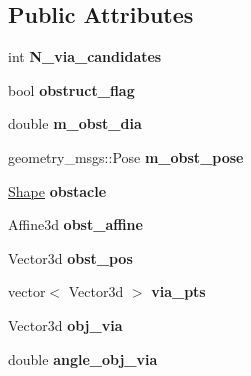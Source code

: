 \subsection*{Public Attributes}
\begin{DoxyCompactItemize}
\item 
\mbox{\label{classTool__Expt__2_afe0cdde93d9fa08f0cab5f3b9ad43127}} 
int {\bfseries N\+\_\+via\+\_\+candidates}
\item 
\mbox{\label{classTool__Expt__2_a69b682644f21f9266c2b8423d44e723c}} 
bool {\bfseries obstruct\+\_\+flag}
\item 
\mbox{\label{classTool__Expt__2_abcb49647ce6c224dfa504269461ce58c}} 
double {\bfseries m\+\_\+obst\+\_\+dia}
\item 
\mbox{\label{classTool__Expt__2_ad30eec8c81aed75a5938d8311330f298}} 
geometry\+\_\+msgs\+::\+Pose {\bfseries m\+\_\+obst\+\_\+pose}
\item 
\mbox{\label{classTool__Expt__2_aa39e482536af894df89c2960ddabb93f}} 
\hyperlink{structShape}{Shape} {\bfseries obstacle}
\item 
\mbox{\label{classTool__Expt__2_a0a84e97236e044343b9e4adc6dfacbc7}} 
Affine3d {\bfseries obst\+\_\+affine}
\item 
\mbox{\label{classTool__Expt__2_afb2f932f6f5aa555677deb46531aaab9}} 
Vector3d {\bfseries obst\+\_\+pos}
\item 
\mbox{\label{classTool__Expt__2_ab1366bd2676ac5ed02d2fb74370d2726}} 
vector$<$ Vector3d $>$ {\bfseries via\+\_\+pts}
\item 
\mbox{\label{classTool__Expt__2_a4e371a2745f78ee64f3c36bc16085cf9}} 
Vector3d {\bfseries obj\+\_\+via}
\item 
\mbox{\label{classTool__Expt__2_afb30ed9a74d6936cedbdb3899e4328cd}} 
double {\bfseries angle\+\_\+obj\+\_\+via}
\item 
\mbox{\label{classTool__Expt__2_a3b620187bb7345a02ffb2e8704961208}} 

\end{DoxyCompactItemize}
